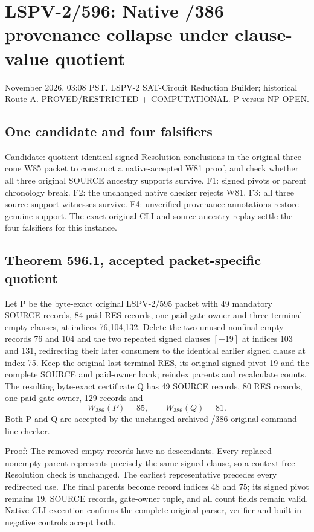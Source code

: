 \documentclass[11pt]{article}
\begin{document}
\section*{LSPV-2/596: Native /386 provenance collapse under clause-value quotient}
 November 2026, 03:08 PST. LSPV-2 SAT-Circuit Reduction Builder; historical Route A. PROVED/RESTRICTED + COMPUTATIONAL. P versus NP OPEN.

\subsection*{One candidate and four falsifiers}
Candidate: quotient identical signed Resolution conclusions in the original three-cone W85 packet to construct a native-accepted W81 proof, and check whether all three original SOURCE ancestry supports survive. F1: signed pivots or parent chronology break. F2: the unchanged native checker rejects W81. F3: all three source-support witnesses survive. F4: unverified provenance annotations restore genuine support. The exact original CLI and source-ancestry replay settle the four falsifiers for this instance.

\subsection*{Theorem 596.1, accepted packet-specific quotient}
Let P be the byte-exact original LSPV-2/595 packet with 49 mandatory SOURCE records, 84 paid RES records, one paid gate owner and three terminal empty clauses, at indices 76,104,132. Delete the two unused nonfinal empty records 76 and 104 and the two repeated signed clauses $[-19]$ at indices 103 and 131, redirecting their later consumers to the identical earlier signed clause at index 75. Keep the original last terminal RES, its original signed pivot 19 and the complete SOURCE and paid-owner bank; reindex parents and recalculate counts. The resulting byte-exact certificate Q has 49 SOURCE records, 80 RES records, one paid gate owner, 129 records and
\[
W_{386}(P)=85,\qquad W_{386}(Q)=81.
\]
Both P and Q are accepted by the unchanged archived /386 original command-line checker.

\noindent Proof: The removed empty records have no descendants. Every replaced nonempty parent represents precisely the same signed clause, so a context-free Resolution check is unchanged. The earliest representative precedes every redirected use. The final parents become record indices 48 and 75; its signed pivot remains 19. SOURCE records, gate-owner tuple, and all count fields remain valid. Native CLI execution confirms the complete original parser, verifier and built-in negative controls accept both.
\end{document}
